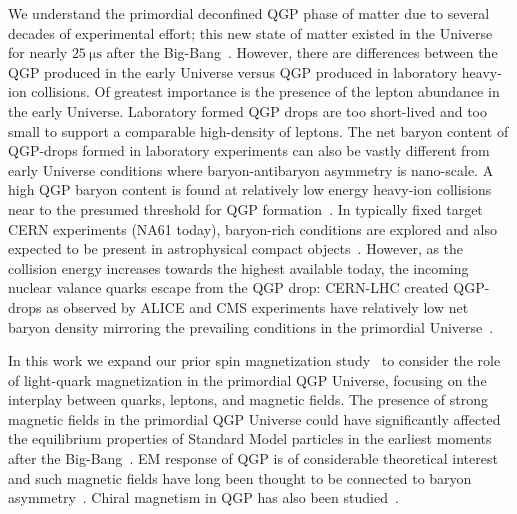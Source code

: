 \documentclass[epjST]{svjour}
\begin{document}
We understand the primordial deconfined QGP phase of matter due to several decades of experimental effort; this new state of matter existed in the Universe for nearly \(25~\mathrm{\mu s}\) after the Big-Bang~\cite{Rafelski:2019twp,Rafelski:2023emw,Rafelski:2024fej}. However, there are differences between the QGP produced in the early Universe versus QGP produced in laboratory heavy-ion collisions. Of greatest importance is the presence of the lepton abundance in the early Universe. Laboratory formed QGP drops are too short-lived and too small to support a comparable high-density of leptons. The net baryon content of QGP-drops formed in laboratory experiments can also be vastly different from early Universe conditions where baryon-antibaryon asymmetry is nano-scale. A high QGP baryon content is found at relatively low energy heavy-ion collisions near to the presumed threshold for QGP formation~\cite{Letessier:2005qe}. In typically fixed target CERN experiments (NA61 today), baryon-rich conditions are explored and also expected to be present in astrophysical compact objects~\cite{Ghosh:2025sjn}. However, as the collision energy increases towards the highest available today, the incoming nuclear valance quarks escape from the QGP drop: CERN-LHC created QGP-drops as observed by ALICE and CMS experiments have relatively low net baryon density mirroring the prevailing conditions in the primordial Universe~\cite{Letessier:2005qe}. 

In this work we expand our prior spin magnetization study~\cite{Steinmetz:2023nsc,Steinmetz:2023ucp} to consider the role of light-quark magnetization in the primordial QGP Universe, focusing on the interplay between quarks, leptons, and magnetic fields. The presence of strong magnetic fields in the primordial QGP Universe could have significantly affected the equilibrium properties of Standard Model particles in the earliest moments after the Big-Bang~\cite{Durrer:2013pga,Subramanian:2015lua}. EM response of QGP is of considerable theoretical interest~\cite{Grayson:2022asf,Shovkovy:2022bnd,Ghosh:2024fkg} and such magnetic fields have long been thought to be connected to baryon asymmetry~\cite{Vachaspati:1991nm,Baym:1995fk}. Chiral magnetism in QGP has also been studied~\cite{Fukushima:2008xe,Boyarsky:2011uy,Bali:2011qj}.
\end{document}
